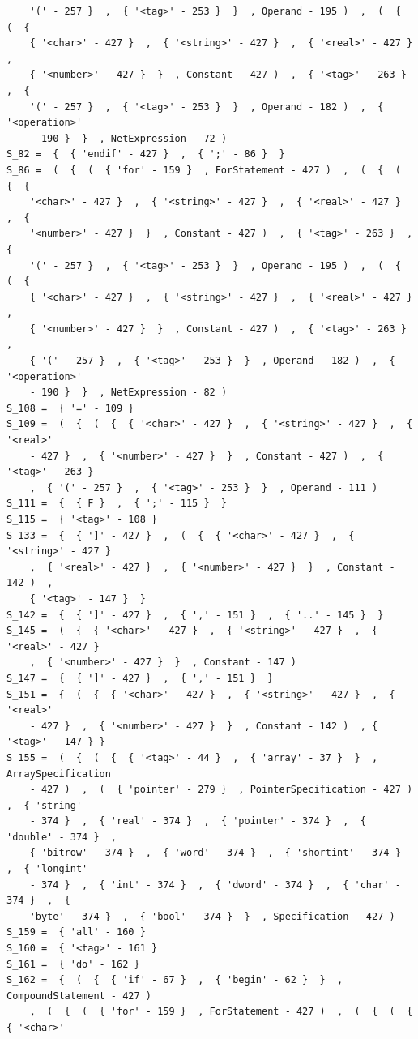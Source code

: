 \documentclass[12pt]{article}
\begin{document}
\begin{verbatim}
    '(' - 257 }  ,  { '<tag>' - 253 }  }  , Operand - 195 )  ,  (  {  (  {  
    { '<char>' - 427 }  ,  { '<string>' - 427 }  ,  { '<real>' - 427 }  ,  
    { '<number>' - 427 }  }  , Constant - 427 )  ,  { '<tag>' - 263 }  ,  { 
    '(' - 257 }  ,  { '<tag>' - 253 }  }  , Operand - 182 )  ,  { '<operation>' 
    - 190 }  }  , NetExpression - 72 ) 
S_82 =  {  { 'endif' - 427 }  ,  { ';' - 86 }  } 
S_86 =  (  {  (  { 'for' - 159 }  , ForStatement - 427 )  ,  (  {  (  {  { 
    '<char>' - 427 }  ,  { '<string>' - 427 }  ,  { '<real>' - 427 }  ,  { 
    '<number>' - 427 }  }  , Constant - 427 )  ,  { '<tag>' - 263 }  ,  { 
    '(' - 257 }  ,  { '<tag>' - 253 }  }  , Operand - 195 )  ,  (  {  (  {  
    { '<char>' - 427 }  ,  { '<string>' - 427 }  ,  { '<real>' - 427 }  ,  
    { '<number>' - 427 }  }  , Constant - 427 )  ,  { '<tag>' - 263 }  ,  
    { '(' - 257 }  ,  { '<tag>' - 253 }  }  , Operand - 182 )  ,  { '<operation>' 
    - 190 }  }  , NetExpression - 82 ) 
S_108 =  { '=' - 109 } 
S_109 =  (  {  (  {  { '<char>' - 427 }  ,  { '<string>' - 427 }  ,  { '<real>' 
    - 427 }  ,  { '<number>' - 427 }  }  , Constant - 427 )  ,  { '<tag>' - 263 }  
    ,  { '(' - 257 }  ,  { '<tag>' - 253 }  }  , Operand - 111 ) 
S_111 =  {  { F }  ,  { ';' - 115 }  } 
S_115 =  { '<tag>' - 108 } 
S_133 =  {  { ']' - 427 }  ,  (  {  { '<char>' - 427 }  ,  { '<string>' - 427 }  
    ,  { '<real>' - 427 }  ,  { '<number>' - 427 }  }  , Constant - 142 )  ,  
    { '<tag>' - 147 }  } 
S_142 =  {  { ']' - 427 }  ,  { ',' - 151 }  ,  { '..' - 145 }  } 
S_145 =  (  {  { '<char>' - 427 }  ,  { '<string>' - 427 }  ,  { '<real>' - 427 }  
    ,  { '<number>' - 427 }  }  , Constant - 147 ) 
S_147 =  {  { ']' - 427 }  ,  { ',' - 151 }  } 
S_151 =  {  (  {  { '<char>' - 427 }  ,  { '<string>' - 427 }  ,  { '<real>' 
    - 427 }  ,  { '<number>' - 427 }  }  , Constant - 142 )  , { '<tag>' - 147 } } 
S_155 =  (  {  (  {  { '<tag>' - 44 }  ,  { 'array' - 37 }  }  , ArraySpecification 
    - 427 )  ,  (  { 'pointer' - 279 }  , PointerSpecification - 427 )  ,  { 'string' 
    - 374 }  ,  { 'real' - 374 }  ,  { 'pointer' - 374 }  ,  { 'double' - 374 }  ,  
    { 'bitrow' - 374 }  ,  { 'word' - 374 }  ,  { 'shortint' - 374 }  ,  { 'longint' 
    - 374 }  ,  { 'int' - 374 }  ,  { 'dword' - 374 }  ,  { 'char' - 374 }  ,  { 
    'byte' - 374 }  ,  { 'bool' - 374 }  }  , Specification - 427 ) 
S_159 =  { 'all' - 160 } 
S_160 =  { '<tag>' - 161 } 
S_161 =  { 'do' - 162 } 
S_162 =  {  (  {  { 'if' - 67 }  ,  { 'begin' - 62 }  }  , CompoundStatement - 427 )  
    ,  (  {  (  { 'for' - 159 }  , ForStatement - 427 )  ,  (  {  (  {  { '<char>' 

\end{verbatim}
\end{document}
